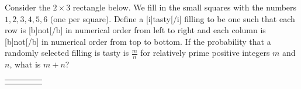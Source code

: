 Consider the $2\times3$ rectangle below. We fill in the small squares with the numbers $1,2,3,4,5,6$ (one per square). Define a [i]tasty[/i] filling to be one such that each row is [b]not[/b] in numerical order from left to right and each column is [b]not[/b] in numerical order from top to bottom. If the probability that a randomly selected filling is tasty is $\frac{m}{n}$ for relatively prime positive integers $m$ and $n$, what is $m+n$?
\begin{center}
    \begin{tabular}{|c|c|c|c|}
    \hline
          &   &  \\ \hline
          &   &  \\ \hline
    \end{tabular}
\end{center}